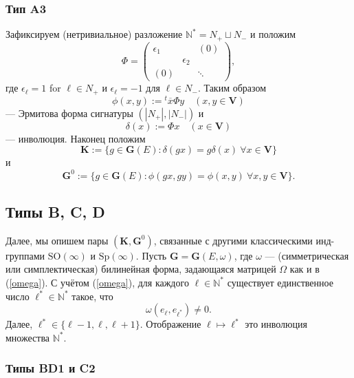 \documentclass{amsart}
\theoremstyle{definition}
\newcommand{\NN}{\mathbb{N}^*}
\begin{document}
\subsubsection{Тип A3}
\label{S:A3}
Зафиксируем (нетривиальное) разложение $\NN=N_+\sqcup N_-$ и положим
\begin{equation}
\label{phi}
\Phi=\left(
\begin{array}{cccc}
\epsilon_1 & & (0) \\
 & \epsilon_2 \\
(0) & & \ddots
\end{array}
\right),
\end{equation}
где $\epsilon_\ell=1$ for $\ell\in N_+$ и $\epsilon_\ell=-1$ для $\ell\in N_-$.
Таким образом
\[\phi(x,y):={}^t\overline{x} \Phi y\quad(x,y\in\mathbf{V})\]
--- Эрмитова форма сигнатуры $(|N_+|,|N_-|)$ и
\[\delta(x):=\Phi x\quad(x\in\mathbf{V})\]
--- инволюция. Наконец положим
\[
\mathbf{K}:=\{g\in \mathbf{G}(E):\delta(gx)=g\delta(x)\ \forall
x\in\mathbf{V}\}
\]
и
\[
\mathbf{G}^0:=\{g\in \mathbf{G}(E):\phi(gx,gy)=\phi(x,y)\ \forall
 x,y\in\mathbf{V}\}.
\]




\subsection*{Типы B, C, D}
Далее, мы опишем пары $(\mathbf{K},\mathbf{G}^0)$, связанные
с другими классическими инд-группами $\mathrm{SO}(\infty)$ и $\mathrm{Sp}(\infty)$.  Пусть $\mathbf{G}=\mathbf{G}(E,\omega)$,
где $\omega$ --- (симметрическая или симплектическая) билинейная форма, задающаяся матрицей $\Omega$ как и в  (\ref{omega}).
С учётом  (\ref{omega}), для каждого $\ell\in\NN$ существует единственное число $\ell^*\in\NN$ такое, что
\[\omega(e_\ell,e_{\ell^*})\not=0.\]
Далее, $\ell^*\in\{\ell-1,\ell,\ell+1\}$. Отображение $\ell\mapsto\ell^*$ это инволюция множества $\NN$.


\subsubsection{Типы BD1 и C2}
\label{S:BD1C2}
\end{document}
